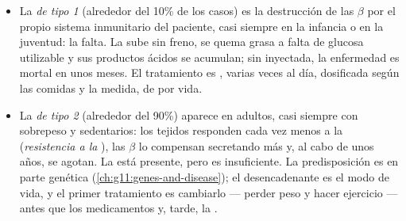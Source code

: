 \begin{proposition}\label{prop:g12:glucose-and-diabetes:types}
\begin{itemize}
  \item La \emph{ de tipo 1} (alrededor del 10\% de los casos)
        es la destrucción de las  $\beta$ por el propio sistema
        inmunitario del paciente, casi siempre en la infancia o en la
        juventud: la  falta. La  sube sin freno, se
        quema grasa a falta de glucosa utilizable y sus productos
        ácidos se acumulan; sin  inyectada, la enfermedad es
        mortal en unos meses. El tratamiento es , varias veces
        al día, dosificada según las comidas y la  medida, de
        por vida.
  \item La \emph{ de tipo 2} (alrededor del 90\%) aparece en
        adultos, casi siempre con sobrepeso y sedentarios: los tejidos
        responden cada vez menos a la  (\emph{resistencia a la
        }), las  $\beta$ lo compensan secretando más y,
        al cabo de unos años, se agotan. La  está presente,
        pero es insuficiente. La predisposición es en parte genética
        (\cref{ch:g11:genes-and-disease}); el desencadenante es el modo
        de vida, y el primer tratamiento es cambiarlo --- perder peso y
        hacer ejercicio --- antes que los medicamentos y, tarde, la
        .
\end{itemize}
\end{proposition}
